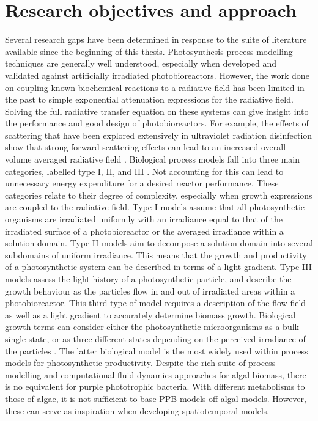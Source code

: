 \section{Research objectives and approach}
\label{Intro:Objectives}
Several research gaps have been determined in response to the suite of literature available since the beginning of this thesis. Photosynthesis process modelling techniques are generally well understood, especially when developed and validated against artificially irradiated photobioreactors.  However, the work done on coupling known biochemical reactions to a radiative field has been limited in the past to simple exponential attenuation expressions for the radiative field. Solving the full radiative transfer equation on these systems can give insight into the performance and good design of photobioreactors. For example, the effects of scattering that have been explored extensively in ultraviolet radiation disinfection show that strong forward scattering effects can lead to an increased overall volume averaged radiative field \cite{santoro}. Biological process models fall into three main categories, labelled type I, II, and III \cite{bechet2013}.  Not accounting for this can lead to unnecessary energy expenditure for a desired reactor performance. These categories relate to their degree of complexity, especially when growth expressions are coupled to the radiative field. Type I models assume that all photosynthetic organisms are irradiated uniformly with an irradiance equal to that of the irradiated surface of a photobioreactor or the averaged irradiance within a solution domain. Type II models aim to decompose a solution domain into several subdomains of uniform irradiance. This means that the growth and productivity of a photosynthetic system can be described in terms of a light gradient. Type III models assess the light history of a photosynthetic particle, and describe the growth behaviour as the particles flow in and out of irradiated areas within a photobioreactor. This third type of model requires a description of the flow field as well as a light gradient to accurately determine biomass growth. Biological growth terms can consider either the photosynthetic microorganisms as a bulk single state, or as three different states depending on the perceived irradiance of the particles \cite{eilers1988}. The latter biological model is the most widely used within process models for photosynthetic productivity. Despite the rich suite of process modelling and computational fluid dynamics approaches for algal biomass, there is no equivalent for purple phototrophic bacteria. With different metabolisms to those of algae, it is not sufficient to base PPB models off algal models. However, these can serve as inspiration when developing spatiotemporal models.

